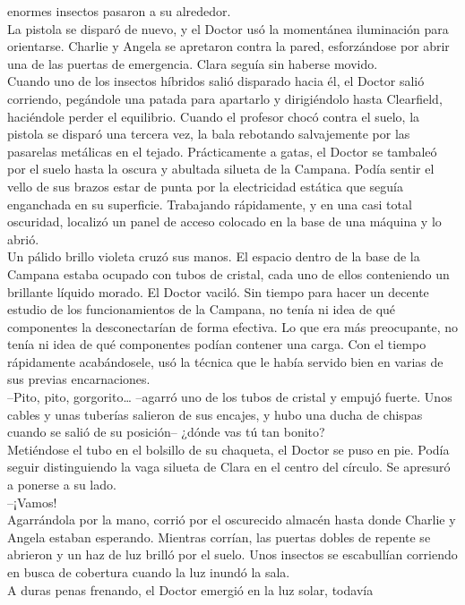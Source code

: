 enormes insectos pasaron a su alrededor.\\
La pistola se disparó de nuevo, y el Doctor usó la momentánea
iluminación para orientarse. Charlie y Angela se apretaron contra la
pared, esforzándose por abrir una de las puertas de emergencia. Clara
seguía sin haberse movido.\\
Cuando uno de los insectos híbridos salió disparado hacia él, el Doctor
salió corriendo, pegándole una patada para apartarlo y dirigiéndolo
hasta Clearfield, haciéndole perder el equilibrio. Cuando el profesor
chocó contra el suelo, la pistola se disparó una tercera vez, la bala
rebotando salvajemente por las pasarelas metálicas en el tejado.
Prácticamente a gatas, el Doctor se tambaleó por el suelo hasta la
oscura y abultada silueta de la Campana. Podía sentir el vello de sus
brazos estar de punta por la electricidad estática que seguía enganchada
en su superficie. Trabajando rápidamente, y en una casi total oscuridad,
localizó un panel de acceso colocado en la base de una máquina y lo
abrió.\\
Un pálido brillo violeta cruzó sus manos. El espacio dentro de la base
de la Campana estaba ocupado con tubos de cristal, cada uno de ellos
conteniendo un brillante líquido morado. El Doctor vaciló. Sin tiempo
para hacer un decente estudio de los funcionamientos de la Campana, no
tenía ni idea de qué componentes la desconectarían de forma efectiva. Lo
que era más preocupante, no tenía ni idea de qué componentes podían
contener una carga. Con el tiempo rápidamente acabándosele, usó la
técnica que le había servido bien en varias de sus previas
encarnaciones.\\
--Pito, pito, gorgorito\ldots{} --agarró uno de los tubos de cristal y
empujó fuerte. Unos cables y unas tuberías salieron de sus encajes, y
hubo una ducha de chispas cuando se salió de su posición-- ¿dónde vas tú
tan bonito?\\
Metiéndose el tubo en el bolsillo de su chaqueta, el Doctor se puso en
pie. Podía seguir distinguiendo la vaga silueta de Clara en el centro
del círculo. Se apresuró a ponerse a su lado.\\
--¡Vamos!\\
Agarrándola por la mano, corrió por el oscurecido almacén hasta donde
Charlie y Angela estaban esperando. Mientras corrían, las puertas dobles
de repente se abrieron y un haz de luz brilló por el suelo. Unos
insectos se escabullían corriendo en busca de cobertura cuando la luz
inundó la sala.\\
A duras penas frenando, el Doctor emergió en la luz solar, todavía
